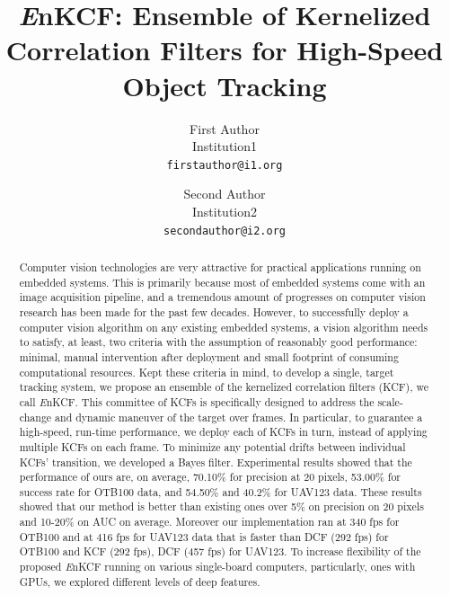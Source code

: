 \documentclass[10pt,twocolumn,letterpaper]{article}
\begin{document}
\title{{\it E}nKCF: Ensemble of Kernelized Correlation Filters for
  High-Speed Object Tracking}

\author{First Author \\
Institution1\\
{\tt\small firstauthor@i1.org}
\and
Second Author \\
Institution2\\
{\tt\small secondauthor@i2.org}
}

\maketitle
\ifwacvfinal\thispagestyle{empty}\fi

\begin{abstract}
Computer vision technologies are very attractive for practical
applications running on embedded systems. This is primarily because
most of embedded systems come with an image acquisition pipeline, and
a tremendous amount of progresses on computer vision research has been
made for the past few decades. However, to successfully deploy a
computer vision algorithm on any existing embedded systems, a vision
algorithm needs to satisfy, at least, two criteria with the assumption
of reasonably good performance: minimal, manual intervention after
deployment and small footprint of consuming computational
resources. Kept these criteria in mind, to develop a single, target
tracking system, we propose an ensemble of the kernelized correlation
filters (KCF), we call {\it E}nKCF. This committee of KCFs is
specifically designed to address the scale-change and dynamic maneuver
of the target over frames. In particular, to guarantee a high-speed,
run-time performance, we deploy each of KCFs in turn, instead of
applying multiple KCFs on each frame. To minimize any potential drifts
between individual KCFs' transition, we developed a Bayes
filter. Experimental results showed that the performance of ours are,
on average, 70.10\% for precision at 20 pixels, 53.00\% for success
rate for OTB100 data, and 54.50\% and 40.2\% for UAV123 data. These
results showed that our method is better than existing ones over 5\%
on precision on 20 pixels and 10-20\% on AUC on average. Moreover our
implementation ran at 340 fps for OTB100 and at 416 fps for UAV123
data that is faster than DCF (292 fps) for OTB100 and KCF (292 fps),
DCF (457 fps) for UAV123. To increase flexibility of the proposed {\it
  E}nKCF running on various single-board computers, particularly, ones
with GPUs, we explored different levels of deep features.
\end{abstract}
\end{document}
